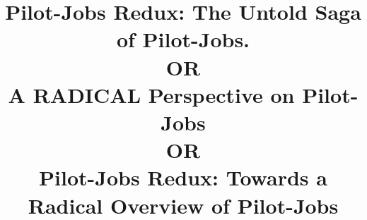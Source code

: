 \documentclass{sig-alternate}
\begin{document}

\title{Pilot-Jobs Redux: The Untold Saga of Pilot-Jobs. \\ OR \\  A RADICAL
  Perspective on Pilot-Jobs \\ OR \\ Pilot-Jobs Redux: Towards a
  Radical Overview of Pilot-Jobs}

\end{document}
